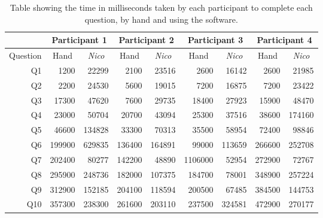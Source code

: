 \documentclass[12pt,twoside,notitlepage,xetex]{report}
\begin{document}
\begin{center}
\begin{table}[H]
\begin{center}
\begin{tabular}{|r||r|r||r|r||r|r||r|r|}
\multicolumn{1}{c|}{} & \multicolumn{2}{c||}{Participant 1} & \multicolumn{2}{c||}{Participant 2} & \multicolumn{2}{c||}{Participant 3} & \multicolumn{2}{c|}{Participant 4}\\ \hline
\multicolumn{1}{|c||}{Question} & \multicolumn{1}{c|}{Hand} & \multicolumn{1}{c||}{\emph{Nico}} & \multicolumn{1}{c|}{Hand} & \multicolumn{1}{c||}{\emph{Nico}} & \multicolumn{1}{c|}{Hand} & \multicolumn{1}{c||}{\emph{Nico}} & \multicolumn{1}{c|}{Hand} & \multicolumn{1}{c|}{\emph{Nico}}\\ \hline \hline
Q1 & 1200 & 22299 & 2100 & 23516 & 2600 & 16142 & 2600 & 21985\\ \hline
Q2 & 2200 & 24530 & 5600 & 19015 & 7200 & 16875 & 7200 & 23422\\ \hline
Q3 & 17300 & 47620 & 7600 & 29735 & 18400 & 27923 & 15900 & 48470\\ \hline
Q4 & 23000 & 50704 & 20700 & 43094 & 25300 & 37516 & 38600 & 174160\\ \hline
Q5 & 46600 & 134828 & 33300 & 70313 & 35500 & 58954 & 72400 & 98846\\ \hline
Q6 & 199900 & 629835 & 136400 & 164891 & 99000 & 113659 & 266600 & 252708\\ \hline
Q7 & 202400 & 80277 & 142200 & 48890 & 1106000 & 52954 & 272900 & 72767\\ \hline
Q8 & 295900 & 248736 & 182000 & 107375 & 184700 & 78001 & 348900 & 257224\\ \hline
Q9 & 312900 & 152185 & 204100 & 118594 & 200500 & 67485 & 384500 & 144753\\ \hline
Q10 & 357300 & 238300 & 261600 & 203110 & 237500 & 324581 & 472900 & 270177\\
\hline
\end{tabular}
\end{center}
\caption{Table showing the time in milliseconds taken by each participant to complete each question, by hand and using the software.}
\label{tab:BigTimes}
\end{table}
\end{center}
\end{document}
